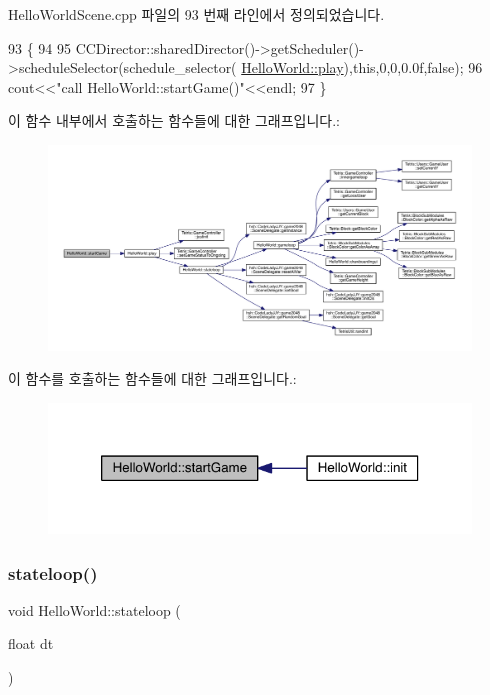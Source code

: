 Hello\+World\+Scene.\+cpp 파일의 93 번째 라인에서 정의되었습니다.


\begin{DoxyCode}
93                           \{
94     
95     CCDirector::sharedDirector()->getScheduler()->scheduleSelector(schedule\_selector(
      \hyperlink{class_hello_world_ac1aee383de0a7c30e84f7efc0da8d944}{HelloWorld::play}),\textcolor{keyword}{this},0,0,0.0f,\textcolor{keyword}{false});
96     cout<<\textcolor{stringliteral}{"call HelloWorld::startGame()"}<<endl;
97 \}
\end{DoxyCode}
이 함수 내부에서 호출하는 함수들에 대한 그래프입니다.\+:
\nopagebreak
\begin{figure}[H]
\begin{center}
\leavevmode
\includegraphics[width=350pt]{d9/d98/class_hello_world_aa4c36099096e160e3726819a2308dd04_cgraph}
\end{center}
\end{figure}
이 함수를 호출하는 함수들에 대한 그래프입니다.\+:
\nopagebreak
\begin{figure}[H]
\begin{center}
\leavevmode
\includegraphics[width=318pt]{d9/d98/class_hello_world_aa4c36099096e160e3726819a2308dd04_icgraph}
\end{center}
\end{figure}
\mbox{\label{class_hello_world_a4ab71b15b7e362af143d2a539e39a538}} 
\subsubsection{\texorpdfstring{stateloop()}{stateloop()}}
{\footnotesize\ttfamily void Hello\+World\+::stateloop (\begin{DoxyParamCaption}\item[{float}]{dt }\end{DoxyParamCaption})\hspace{0.3cm}{\ttfamily [protected]}}


